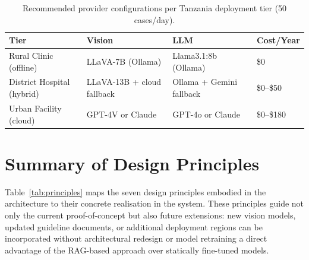 \documentclass[12pt,a4paper]{report}
\begin{document}
	\begin{table}[H]
		\centering
		\caption{Recommended provider configurations per Tanzania deployment tier (50 cases/day).}
		\label{tab:deployment_tiers}
		{\small
			\begin{tabular}{p{3.0cm}p{3.5cm}p{3.5cm}p{2.0cm}}
				\toprule
				\textbf{Tier} & \textbf{Vision} & \textbf{LLM} & \textbf{Cost/Year} \\
				\midrule
				Rural Clinic (offline)
				& LLaVA-7B (Ollama)
				& Llama3.1:8b (Ollama)
				& \$0 \\
				District Hospital (hybrid)
				& LLaVA-13B + cloud fallback
				& Ollama + Gemini fallback
				& \$0--\$50 \\
				Urban Facility (cloud)
				& GPT-4V or Claude
				& GPT-4o or Claude
				& \$0--\$180 \\
				\bottomrule
			\end{tabular}
		}
	\end{table}
	
	\section{Summary of Design Principles}
	\label{sec:principles}
	
	Table~\ref{tab:principles} maps the seven design principles embodied in the architecture to
	their concrete realisation in the system. These principles guide not only the current
	proof-of-concept but also future extensions: new vision models, updated guideline documents,
	or additional deployment regions can be incorporated without architectural redesign or model
	retraining a direct advantage of the RAG-based approach over statically fine-tuned models.
	
\end{document}
